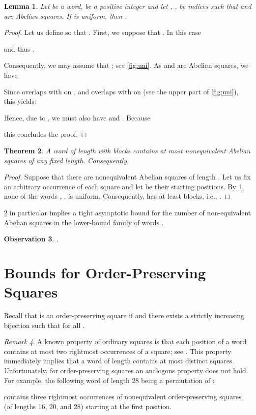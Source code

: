 \documentclass{article}
\theoremstyle{plain}
\newtheorem{theorem}{Theorem}[section]
\newtheorem{lemma}[theorem]{Lemma}
\newtheorem{observation}[theorem]{Observation}
\theoremstyle{definition}
\theoremstyle{remark}
\newtheorem{remark}[theorem]{Remark}
\begin{document}
  \begin{lemma}\label{lem:uniform}
  Let  be a word,  be a positive integer and let , , be indices such that  and 
  are Abelian squares. If  is uniform, then .
  \end{lemma}
  \begin{proof}
  Let us define  so that .
  First, we suppose that . 
  In this case 
  
  and thus .
  
  Consequently, we may assume that ; see \cref{fig:uni}. As  and  are Abelian squares, we have
  
  Since  overlaps with  on , and  overlaps with  on 
  (see the upper part of \cref{fig:uni}), this yields:
  
  Hence, due to , we must also have  and .
  Because
  
  this concludes the proof.  
  \end{proof}
  
  \begin{theorem}\label{thm:ab-upper-bound-k-blocks}
    A word  of length  with  blocks contains at most  non\-equivalent Abelian squares of any fixed length. 
    Consequently, 
  \end{theorem}
  \begin{proof}
    Suppose that there are  nonequivalent Abelian squares of length .  
    Let us fix an arbitrary occurrence of each square and let  be their starting positions. 
    By \cref{lem:uniform}, none of the words , , is uniform. 
    Consequently,  has at least  blocks, i.e., .
  \end{proof}

  \cref{thm:ab-upper-bound-k-blocks} in particular implies a tight asymptotic bound for the
  number of non-equivalent Abelian squares in the lower-bound family of words .
  \begin{observation}
    .
  \end{observation}

  \section{Bounds for Order-Preserving Squares}\label{sec:op}
  Recall that  is an order-preserving square if  and there exists a strictly increasing
  bijection  such that  for all .

  \begin{remark}\label{rmk:op_last}
    A known property of ordinary squares is that each position of a word contains at most
    two rightmost occurrences of a square; see \cite{fraenkel-simpson}.
    This property immediately implies that a word of length  contains at most  distinct squares.
    Unfortunately, for order-preserving squares an analogous property does not hold.
    For example, the following word of length 28 being a permutation of :
    
    contains three rightmost occurrences of nonequivalent order-preserving squares (of lengths 16, 20, and 28) starting at the first position.
  \end{remark}
  
\end{document}
